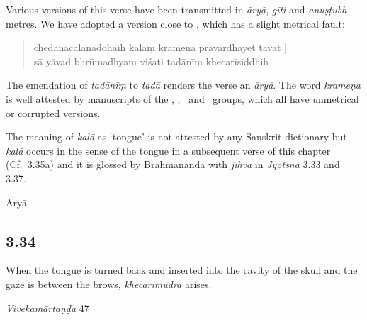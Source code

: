 \begin{ekdosis}
\begin{philcomm}[hp03_033]
Various versions of this verse have been transmitted in \emph{āryā}, \emph{gīti} and \emph{anuṣṭubh} metres. We have adopted a version close to \alphaTwo, which has a slight metrical fault:
\begin{quote}
 chedanacālanadohaiḥ kalāṃ krameṇa pravardhayet tāvat |\\
 sā yāvad bhrūmadhyaṃ viśati tadānīṃ khecarīsiddhiḥ ||
\end{quote}
The emendation of \emph{tadānīṃ} to \emph{tadā} renders the verse an \emph{āryā}. The word \emph{krameṇa} is well attested by manuscripts of the \textalpha, \textbeta, \texteta\ and  \textepsilon\ groups, which all have unmetrical or corrupted versions. 

The meaning of \emph{kalā} as `tongue' is not attested by any Sanskrit dictionary but \emph{kalā} occurs in the sense of the tongue in a subsequent verse of this chapter (Cf.~3.35a) and it is glossed by Brahmānanda with \emph{jihvā} in \emph{Jyotsnā} 3.33 and 3.37.
%
\end{philcomm}

\begin{metre}[hp03_033]
Āryā
\end{metre}

\subsection*{3.34}
\begin{translation}[hp03_034]
When the tongue is turned back and inserted into the cavity of the skull and the gaze is between the brows, \emph{khecarīmudrā} arises.
\end{translation}

\begin{sources}[hp03_034]
\emph{Vivekamārtaṇḍa} 47
\begin{versinnote}
\end{versinnote}
\end{sources}


\end{ekdosis}
